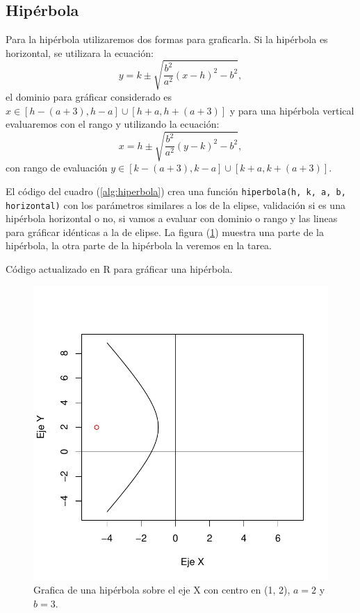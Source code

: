 \documentclass[12pt,a4paper]{article} %
\begin{document}
\newpage
\subsection{Hipérbola}

Para la hipérbola utilizaremos dos formas para graficarla. Si la hipérbola es horizontal, se utilizara la ecuación:
\begin{equation}
y = k \pm \sqrt{\frac{b^2}{a^2}(x - h)^2 - b^2}, \label{eq:hiperbolah}
\end{equation}
el dominio para gráficar considerado es $x \in [h - (a + 3), h - a] \cup [h + a, h + (a + 3)]$ y para una hipérbola vertical evaluaremos con el rango y utilizando la ecuación:
\begin{equation}
x = h \pm \sqrt{\frac{b^2}{a^2}(y - k)^2 - b^2}, \label{eq:hiperobolav}
\end{equation}
con rango de evaluación $y \in [k - (a + 3), k - a] \cup [k + a, k + (a + 3)]$.

El código del cuadro (\ref{alg:hiperbola}) crea una función \texttt{hiperbola(h, k, a, b, horizontal)} con los parámetros similares a los de la elipse, validación si es una hipérbola horizontal o no, si vamos a evaluar con dominio o rango y las lineas para gráficar idénticas a la de elipse. La figura (\ref{fig:hiperbola}) muestra una parte de la hipérbola, la otra parte de la hipérbola la veremos en la tarea.

\begin{table}[htpb]
	
	\caption{Código actualizado en R para gráficar una hipérbola.}
	\label{alg:hiperbola}
\end{table}

\begin{figure}
\centering
\includegraphics[scale=0.75]{hiperbola}
\caption{Grafica de una hipérbola sobre el eje X con centro en (1, 2), $a = 2$ y $b = 3$.}
\label{fig:hiperbola}
\end{figure}
\end{document}
